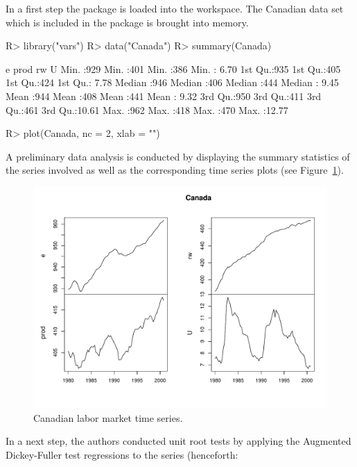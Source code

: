 \documentclass[nojss]{jss}
\begin{document}
In a first step the package  is loaded into the
workspace. The Canadian data set which is included in the package
 is brought into memory. 
\begin{Schunk}
\begin{Sinput}
R> library("vars")
R> data("Canada")
R> summary(Canada)
\end{Sinput}
\begin{Soutput}
       e            prod           rw            U        
 Min.   :929   Min.   :401   Min.   :386   Min.   : 6.70  
 1st Qu.:935   1st Qu.:405   1st Qu.:424   1st Qu.: 7.78  
 Median :946   Median :406   Median :444   Median : 9.45  
 Mean   :944   Mean   :408   Mean   :441   Mean   : 9.32  
 3rd Qu.:950   3rd Qu.:411   3rd Qu.:461   3rd Qu.:10.61  
 Max.   :962   Max.   :418   Max.   :470   Max.   :12.77  
\end{Soutput}
\begin{Sinput}
R> plot(Canada, nc = 2, xlab = "")
\end{Sinput}
\end{Schunk}
A preliminary data analysis is conducted by displaying the summary
statistics of the series involved as well as the corresponding time
series plots (see Figure~\ref{fig-1}). 
\begin{figure}[t]
\centering  
\includegraphics{Figures/fig-1}
\caption{Canadian labor market time series.}
\label{fig-1}
\end{figure}
In a next step, the authors conducted unit root tests by applying
the Augmented Dickey-Fuller test regressions to the series (henceforth:
\end{document}
